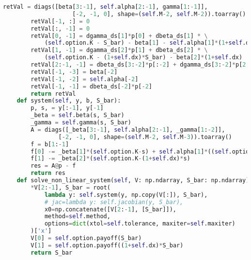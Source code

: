 \begin{lstlisting}[language=Python, caption=Implicit solver for Nielsen transformation]
        retVal = diags([beta[3:-1], self.alpha[2:-1], gamma[1:-1]],
                    [-2, -1, 0], shape=(self.M-2, self.M-2)).toarray()
        retVal[-1, :] = 0
        retVal[:, -1] = 0
        retVal[0, -1] = dgamma_ds[1]*p[0] + dbeta_ds[1] * \
            (self.option.K - S_bar) - beta[1] - self.alpha[1]*(1+self.dx)
        retVal[1, -1] = dgamma_ds[2]*p[1] + dbeta_ds[2] * \
            (self.option.K - (1+self.dx)*S_bar) - beta[2]*(1+self.dx)
        retVal[2:-1, -1] = dbeta_ds[3:-2]*p[:-2] + dgamma_ds[3:-2]*p[2:]
        retVal[-1, -3] = beta[-2]
        retVal[-1, -2] = self.alpha[-2]
        retVal[-1, -1] = dbeta_ds[-2]*p[-2]
        return retVal
    def system(self, y, b, S_bar):
        p, s, = y[:-1], y[-1]
        _beta = self.beta(s, S_bar)
        _gamma = self.gamma(s, S_bar)
        A = diags([_beta[3:-1], self.alpha[2:-1], _gamma[1:-2]],
                [-2, -1, 0], shape=(self.M-2, self.M-3)).toarray()
        f = b[1:-1]
        f[0] -= _beta[1]*(self.option.K-s) + self.alpha[1]*((self.option.K-(1+self.dx)*s))
        f[1] -= _beta[2]*(self.option.K-(1+self.dx)*s)
        res = A@p - f
        return res
    def solve_non_linear_system(self, V: np.ndarray, S_bar: np.ndarray):
        *V[2:-1], S_bar = root(
            lambda y: self.system(y, np.copy(V[:]), S_bar),
            # jac=lambda y: self.jacobian(y, S_bar),
            x0=np.concatenate([V[2:-1], [S_bar]]),
            method=self.method,
            options=dict(xtol=self.tolerance, maxiter=self.maxiter)
        )['x']
        V[0] = self.option.payoff(S_bar)
        V[1] = self.option.payoff((1+self.dx)*S_bar)    
        return S_bar
\end{lstlisting}

